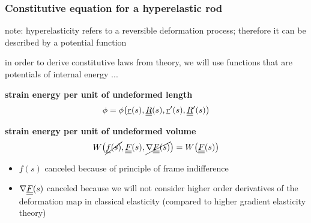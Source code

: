 \begin{frame}
  \frametitle{Constitutive equation for a hyperelastic rod}
  
  note: hyperelasticity refers to a reversible deformation process; \newline
  therefore it can be described by a potential function
  
  \vspace{0.7em}
  in order to derive constitutive laws from theory, \newline
  we will use functions that are potentials of internal energy ... 
  
  \vspace{1.5em}
  \textbf{strain energy per unit of undeformed length}
  \begin{displaymath}
    \phi = \phi \bigl( \underline{r}(s),\underline{\underline{R}}(s),\underline{r}^{\prime}(s),\underline{\underline{R}}^{\prime}(s) \bigr)
  \end{displaymath}
  
  \vspace{1.5em}
  \textbf{strain energy per unit of undeformed volume}
  \begin{displaymath}
    W \bigl( \cancel{\underline{f}(s)}, \underline{\underline{F}}(s), \cancel{\nabla \underline{\underline{F}}(s)} \bigr) = W \bigl( \underline{\underline{F}}(s) \bigr)
  \end{displaymath}

  \vspace{0.1em}
  \begin{itemize}
    \item $\underline{f}(s)$ canceled because of principle of frame indifference
    \item $\nabla \underline{\underline{F}}(s)$ canceled because we will not consider higher order derivatives of the deformation map in classical elasticity (compared to higher gradient elasticity theory)
  \end{itemize}
\end{frame}


